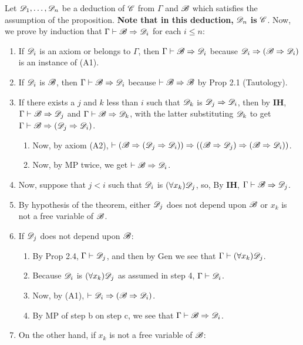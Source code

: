 Let $\mathscr{D}_1, \dots, \mathscr{D}_n$ be a deduction of $\mathscr{C}$ from $\Gamma$ and $\mathscr{B}$ which satisfies the assumption of the proposition. \textbf{Note that in this deduction, } $\mathscr{D}_n$ \textbf{is} $\mathscr{C}$. Now, we prove by induction that $\Gamma \vdash \mathscr{B} \Rightarrow \mathscr{D}_i$ for each $i \leq n$:
\begin{enumerate}
    \item If $\mathscr{D}_i$ is an axiom or belongs to $\Gamma$, then $\Gamma \vdash \mathscr{B} \Rightarrow \mathscr{D}_i$ because $\mathscr{D}_i \Rightarrow (\mathscr{B} \Rightarrow \mathscr{D}_i)$ is an instance of (A1).
    \item If $\mathscr{D}_i$ is $\mathscr{B}$, then $\Gamma \vdash \mathscr{B} \Rightarrow \mathscr{D}_i$ because $\vdash \mathscr{B} \Rightarrow \mathscr{B}$ by Prop 2.1 (Tautology).
    \item If there exists a $j$ and $k$ less than $i$ such that $\mathscr{D}_k$ is $\mathscr{D}_j \Rightarrow \mathscr{D}_i$, then by \textbf{IH}, $\Gamma \vdash \mathscr{B} \Rightarrow \mathscr{D}_j$ and $\Gamma \vdash \mathscr{B} \Rightarrow \mathscr{D}_k$, with the latter substituting $\mathscr{D}_k$ to get $\Gamma \vdash \mathscr{B} \Rightarrow (\mathscr{D}_j \Rightarrow \mathscr{D}_i)$. 
        \begin{enumerate} [label = \alph*.]
            \item Now, by axiom (A2), $\vdash (\mathscr{B} \Rightarrow ( \mathscr{D}_j \Rightarrow \mathscr{D}_i)) \Rightarrow ((\mathscr{B} \Rightarrow \mathscr{D}_j) \Rightarrow (\mathscr{B} \Rightarrow \mathscr{D}_i))$.
            \item Now, by MP twice, we get $\vdash \mathscr{B} \Rightarrow \mathscr{D}_i$.
        \end{enumerate}
    \item Now, suppose that $j<i$ such that $\mathscr{D}_i$ is $(\forall x_k)\mathscr{D}_j$, so, By \textbf{IH}, $\Gamma \vdash \mathscr{B} \Rightarrow \mathscr{D}_j$.
    \item By hypothesis of the theorem, either $\mathscr{D}_j$ does not depend upon $\mathscr{B}$ or $x_k$ is not a free variable of $\mathscr{B}$.
    \item If $\mathscr{D}_j$ does not depend upon $\mathscr{B}$:
        \begin{enumerate} [label = \alph*.]
            \item By Prop 2.4, $\Gamma \vdash \mathscr{D}_j$, and then by Gen we see that $\Gamma \vdash (\forall x_k) \mathscr{D}_j$. 
            \item Because $\mathscr{D}_i$ is $(\forall x_k)\mathscr{D}_j$ as assumed in step 4, $\Gamma \vdash \mathscr{D}_i$.
            \item Now, by (A1), $\vdash \mathscr{D}_i \Rightarrow (\mathscr{B} \Rightarrow \mathscr{D}_i)$.
            \item By MP of step b on step c, we see that $\Gamma \vdash \mathscr{B} \Rightarrow \mathscr{D}_i$.
        \end{enumerate}
    \item On the other hand, if $x_k$ is not a free variable of $\mathscr{B}$:
        \begin{enumerate} [label = \alph*.]

\end{enumerate}
\end{enumerate}
